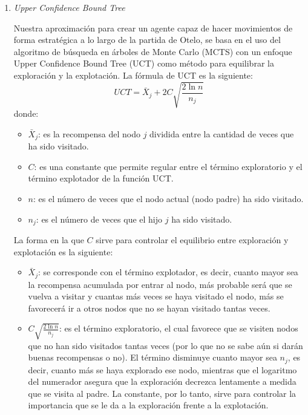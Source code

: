 \documentclass[conference,a4paper]{IEEEtran}
\begin{document}
\begin{enumerate}

  \item \textit{Upper Confidence Bound Tree}

  Nuestra aproximación para crear un agente capaz de hacer movimientos de forma estratégica
  a lo largo de la partida de Otelo, se basa en el uso del algoritmo de búsqueda en árboles
  de Monte Carlo (MCTS) con un enfoque Upper Confidence Bound Tree (UCT) como método para
  equilibrar la exploración y la explotación. La fórmula de UCT es la siguiente:
  \[
  UCT = \bar{X}_j + 2C \sqrt{\frac{2 \ln{n}}{n_j}} 
  \]
  donde:

  \begin{itemize}
    \item $\bar{X}_j$: es la recompensa del nodo $j$ dividida entre la cantidad de veces que 
    ha sido visitado.
    \item $C$: es una constante que permite regular entre el término exploratorio y el término
    explotador de la función UCT.
    \item $n$: es el número de veces que el nodo actual (nodo padre) ha sido visitado.
    \item $n_j$: es el número de veces que el hijo $j$ ha sido visitado.
  \end{itemize}

  La forma en la que $C$ sirve para controlar el equilibrio entre exploración y explotación
  es la siguiente:
  \begin{itemize}
    \item $\bar{X}_j$: se corresponde con el término explotador, es decir, cuanto mayor sea la
    recompensa acumulada por entrar al nodo, más probable será que se vuelva a visitar y cuantas
    más veces se haya visitado el nodo, más se favorecerá ir a otros nodos que no se hayan visitado
    tantas veces.
    \item $C \sqrt{\frac{2 \ln{n}}{n_j}}$: es el término exploratorio, el cual favorece que se visiten
    nodos que no han sido visitados tantas veces (por lo que no se sabe aún si darán buenas recompensas
    o no). El término disminuye cuanto mayor sea $n_j$, es decir, cuanto más se haya explorado ese nodo, mientras
    que el logaritmo del numerador asegura que la exploración decrezca lentamente a medida que se visita al
    padre. La constante, por lo tanto, sirve para controlar la importancia que se le da a la exploración
    frente a la explotación.
  \end{itemize}


\end{enumerate}
\end{document}
